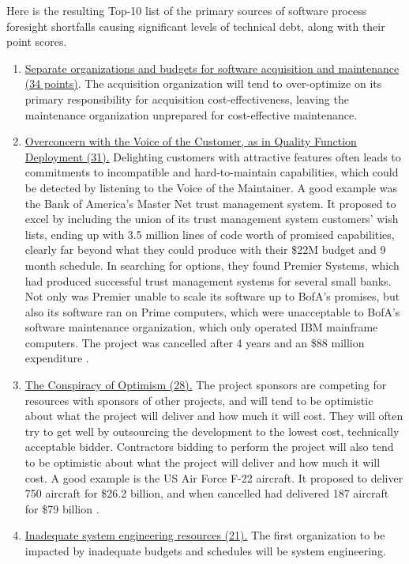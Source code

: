 Here is the resulting Top-10 list of the primary sources of software process foresight shortfalls causing significant levels of technical debt, along with their point scores.
\begin{enumerate}
	\item \ul{Separate organizations and budgets for software acquisition and maintenance (34 points)}.
	The acquisition organization will tend to over-optimize on its primary responsibility for acquisition cost-effectiveness, leaving the maintenance organization unprepared for cost-effective maintenance.
	\item \ul{Overconcern with the Voice of the Customer, as in Quality Function Deployment (31).}
	\cite{akao1994development} Delighting customers with attractive features often leads to commitments to incompatible and hard-to-maintain capabilities, which could be detected by listening to the Voice of the Maintainer.
	A good example was the Bank of America's Master Net trust management system.
	It proposed to excel by including the union of its trust management system customers' wish lists, ending up with 3.5 million lines of code worth of promised capabilities, clearly far beyond what they could produce with their \$22M budget and 9 month schedule.
	In searching for options, they found Premier Systems, which had produced successful trust management systems for several small banks.
	Not only was Premier unable to scale its software up to BofA's promises, but also its software ran on Prime computers, which were unacceptable to BofA's software maintenance organization, which only operated IBM mainframe computers.
	The project was cancelled after 4 years and an \$88 million expenditure \cite{glass1997software}.
	\item \ul{The Conspiracy of Optimism (28).}
	The project sponsors are competing for resources with sponsors of other projects, and will tend to be optimistic about what the project will deliver and how much it will cost.
	They will often try to get well by outsourcing the development to the lowest cost, technically acceptable bidder.
	Contractors bidding to perform the project will also tend to be optimistic about what the project will deliver and how much it will cost.
	A good example is the US Air Force F-22 aircraft.
	It proposed to deliver 750 aircraft for \$26.2 billion, and when cancelled had delivered 187 aircraft for \$79 billion \cite{haffa2016learning}.
	\item \ul{Inadequate system engineering resources (21).}
	The first organization to be impacted by inadequate budgets and schedules will be system engineering.

\end{enumerate}
